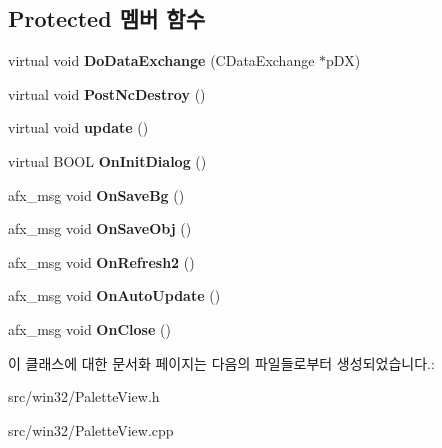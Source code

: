 \subsection*{Protected 멤버 함수}
\begin{DoxyCompactItemize}
\item 
\mbox{\label{class_palette_view_ab6773c354d2dbf71f320a37d58889b84}} 
virtual void {\bfseries Do\+Data\+Exchange} (C\+Data\+Exchange $\ast$p\+DX)
\item 
\mbox{\label{class_palette_view_a04d420d2e5e101622394b6da9bcd4a52}} 
virtual void {\bfseries Post\+Nc\+Destroy} ()
\item 
\mbox{\label{class_palette_view_a94549cb400d23e790497c4263bf1e09b}} 
virtual void {\bfseries update} ()
\item 
\mbox{\label{class_palette_view_a5b6b2d948cd58f3fe450ffd7322bc9f7}} 
virtual B\+O\+OL {\bfseries On\+Init\+Dialog} ()
\item 
\mbox{\label{class_palette_view_a4e11f19e5535efcd1b34d38899f18482}} 
afx\+\_\+msg void {\bfseries On\+Save\+Bg} ()
\item 
\mbox{\label{class_palette_view_a1a09199a2ab1045bbbcef736d05296c1}} 
afx\+\_\+msg void {\bfseries On\+Save\+Obj} ()
\item 
\mbox{\label{class_palette_view_ae5eaa6866be56bc87f8fe73033947c7d}} 
afx\+\_\+msg void {\bfseries On\+Refresh2} ()
\item 
\mbox{\label{class_palette_view_a4308e6a50e6b4870432bcb90c03f3c91}} 
afx\+\_\+msg void {\bfseries On\+Auto\+Update} ()
\item 
\mbox{\label{class_palette_view_a58ce1d32d85fc8ee06f4e97948684cea}} 
afx\+\_\+msg void {\bfseries On\+Close} ()
\end{DoxyCompactItemize}


이 클래스에 대한 문서화 페이지는 다음의 파일들로부터 생성되었습니다.\+:\begin{DoxyCompactItemize}
\item 
src/win32/Palette\+View.\+h\item 
src/win32/Palette\+View.\+cpp\end{DoxyCompactItemize}
